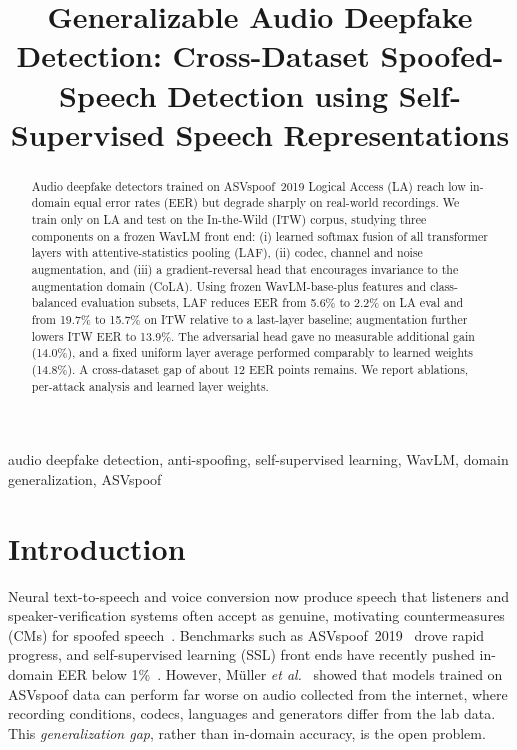 \documentclass[conference]{IEEEtran}
\begin{document}
\title{Generalizable Audio Deepfake Detection: Cross-Dataset Spoofed-Speech Detection using Self-Supervised Speech Representations}
\author{
}
\date{}
\maketitle

\begin{abstract}
Audio deepfake detectors trained on ASVspoof~2019 Logical Access (LA) reach low in-domain equal error rates (EER) but degrade sharply on real-world recordings. We train only on LA and test on the In-the-Wild (ITW) corpus, studying three components on a frozen WavLM front end: (i) learned softmax fusion of all transformer layers with attentive-statistics pooling (LAF), (ii) codec, channel and noise augmentation, and (iii) a gradient-reversal head that encourages invariance to the augmentation domain (CoLA). Using frozen WavLM-base-plus features and class-balanced evaluation subsets, LAF reduces EER from 5.6\% to 2.2\% on LA eval and from 19.7\% to 15.7\% on ITW relative to a last-layer baseline; augmentation further lowers ITW EER to 13.9\%. The adversarial head gave no measurable additional gain (14.0\%), and a fixed uniform layer average performed comparably to learned weights (14.8\%). A cross-dataset gap of about 12 EER points remains. We report ablations, per-attack analysis and learned layer weights.
\end{abstract}
\begin{IEEEkeywords}audio deepfake detection, anti-spoofing, self-supervised learning, WavLM, domain generalization, ASVspoof\end{IEEEkeywords}

\section{Introduction}
Neural text-to-speech and voice conversion now produce speech that listeners and speaker-verification systems often accept as genuine, motivating countermeasures (CMs) for spoofed speech~\cite{yi2023survey}. Benchmarks such as ASVspoof~2019~\cite{wang2020asvspoof2019} drove rapid progress, and self-supervised learning (SSL) front ends have recently pushed in-domain EER below 1\%~\cite{tak2022wav2vec,wang2022investigating}. However, Müller \emph{et al.}~\cite{muller2022does} showed that models trained on ASVspoof data can perform far worse on audio collected from the internet, where recording conditions, codecs, languages and generators differ from the lab data. This \emph{generalization gap}, rather than in-domain accuracy, is the open problem.
\end{document}
